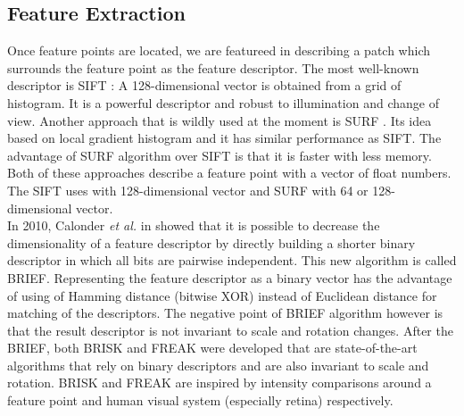\subsection{Feature Extraction} \label{subsec:feature_extraction}
Once feature points are located, we are featureed in describing a patch which surrounds the feature point as the feature descriptor. The most well-known descriptor is SIFT \cite{lowe2004distinctive}: A 128-dimensional vector is obtained from a grid of histogram. It is a powerful descriptor and robust to illumination and change of view. Another approach that is wildly used at the moment is SURF \cite{bay2006surf}. Its idea based on local gradient histogram and it has similar performance as SIFT. The advantage of SURF algorithm over SIFT is that it is faster with less memory. Both of these approaches describe a feature point with a vector of float numbers. The SIFT uses with 128-dimensional vector and SURF with 64 or 128-dimensional vector.\\
In 2010, Calonder \textit{et al.} in \cite{calonder2010brief} showed that it is possible to decrease the dimensionality of a feature descriptor by directly building a shorter binary descriptor in which all bits are pairwise independent. This new algorithm is called BRIEF. Representing the feature descriptor as a binary vector has the advantage of using of Hamming distance (bitwise XOR) instead of Euclidean distance for matching of the descriptors. The negative point of BRIEF algorithm however is that the result descriptor is not invariant to scale and rotation changes. After the BRIEF, both BRISK \cite{leutenegger2011brisk} and FREAK \cite{alahi2012freak} were developed that are state-of-the-art algorithms that rely on binary descriptors and are also invariant to scale and rotation. BRISK and FREAK are inspired by intensity comparisons around a feature point and human visual system (especially retina) respectively.

